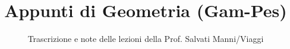 \documentclass[a4paper,12pt]{article}
\title{Appunti di Geometria (Gam-Pes)}
\author{Trascrizione e note delle lezioni della Prof. Salvati Manni/Viaggi}
\date{}
\begin{document}
\maketitle
\projectintro
\tableofcontents
\newpage

\end{document}
